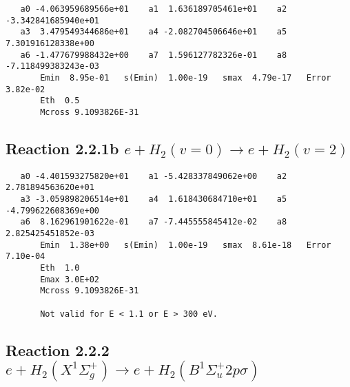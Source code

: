 \documentclass[12pt,dvipdfm]{article}
\begin{document}
\begin{small}\begin{verbatim}
   a0 -4.063959689566e+01    a1  1.636189705461e+01    a2 -3.342841685940e+01
   a3  3.479549344686e+01    a4 -2.082704506646e+01    a5  7.301916128338e+00
   a6 -1.477679988432e+00    a7  1.596127782326e-01    a8 -7.118499383243e-03
       Emin  8.95e-01   s(Emin)  1.00e-19   smax  4.79e-17   Error  3.82e-02
       Eth  0.5
       Mcross 9.1093826E-31
\end{verbatim}\end{small}




\newpage
\subsection{
Reaction 2.2.1b $   e + H_2(v=0) \rightarrow e + H_2(v=2)$}



\begin{small}\begin{verbatim}
   a0 -4.401593275820e+01    a1 -5.428337849062e+00    a2  2.781894563620e+01
   a3 -3.059898206514e+01    a4  1.618430684710e+01    a5 -4.799622608369e+00
   a6  8.162961901622e-01    a7 -7.445555845412e-02    a8  2.825425451852e-03
       Emin  1.38e+00   s(Emin)  1.00e-19   smax  8.61e-18   Error  7.10e-04
       Eth  1.0
       Emax 3.0E+02
       Mcross 9.1093826E-31

       Not valid for E < 1.1 or E > 300 eV.
\end{verbatim}\end{small}





\newpage
\subsection{
Reaction 2.2.2 $e + H_2(X^1\Sigma_g^+) \rightarrow e + H_2(B^1\Sigma_u^+2p\sigma)$}






\end{document}
